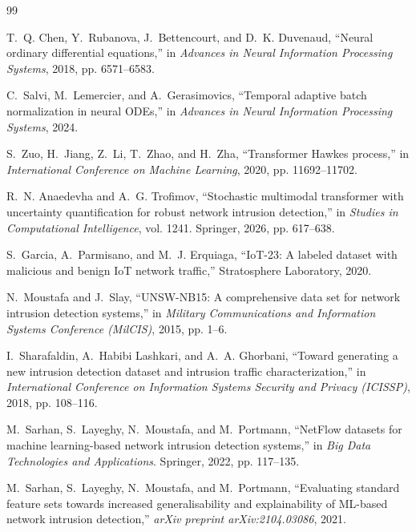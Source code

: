 \documentclass[lettersize,journal]{IEEEtran}
\begin{document}

\begin{thebibliography}{99}

T.~Q. Chen, Y.~Rubanova, J.~Bettencourt, and D.~K. Duvenaud,
``Neural ordinary differential equations,''
in \emph{Advances in Neural Information Processing Systems}, 2018, pp. 6571--6583.

C.~Salvi, M.~Lemercier, and A.~Gerasimovics,
``Temporal adaptive batch normalization in neural ODEs,''
in \emph{Advances in Neural Information Processing Systems}, 2024.

S.~Zuo, H.~Jiang, Z.~Li, T.~Zhao, and H.~Zha,
``Transformer Hawkes process,''
in \emph{International Conference on Machine Learning}, 2020, pp. 11692--11702.

R.~N. Anaedevha and A.~G. Trofimov,
``Stochastic multimodal transformer with uncertainty quantification for robust network intrusion detection,''
in \emph{Studies in Computational Intelligence}, vol. 1241. Springer, 2026, pp. 617--638.

S.~Garcia, A.~Parmisano, and M.~J. Erquiaga,
``IoT-23: A labeled dataset with malicious and benign IoT network traffic,''
Stratosphere Laboratory, 2020.

N.~Moustafa and J.~Slay,
``UNSW-NB15: A comprehensive data set for network intrusion detection systems,''
in \emph{Military Communications and Information Systems Conference (MilCIS)}, 2015, pp. 1--6.

I.~Sharafaldin, A.~Habibi Lashkari, and A.~A. Ghorbani,
``Toward generating a new intrusion detection dataset and intrusion traffic characterization,''
in \emph{International Conference on Information Systems Security and Privacy (ICISSP)}, 2018, pp. 108--116.

M.~Sarhan, S.~Layeghy, N.~Moustafa, and M.~Portmann,
``NetFlow datasets for machine learning-based network intrusion detection systems,''
in \emph{Big Data Technologies and Applications}. Springer, 2022, pp. 117--135.

M.~Sarhan, S.~Layeghy, N.~Moustafa, and M.~Portmann,
``Evaluating standard feature sets towards increased generalisability and explainability of ML-based network intrusion detection,''
\emph{arXiv preprint arXiv:2104.03086}, 2021.


\end{thebibliography}
\end{document}
